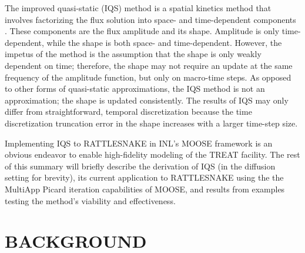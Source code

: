 \documentclass[12pt]{article}
\begin{document}
The improved quasi-static (IQS) method is a spatial kinetics method that involves factorizing the flux solution into space- and time-dependent components \cite{Ott_1966,Dulla2008}.  These components are the flux amplitude and its shape. Amplitude is only time-dependent, while the shape is both space- and time-dependent.  However, the impetus of the method is the assumption that the shape is only weakly dependent on time; therefore, the shape may not require an update at the same frequency of the amplitude function, but only on macro-time steps. As opposed to other forms of quasi-static approximations, the IQS method is not an approximation; the shape is updated consistently.  The results of IQS may only differ from straightforward, temporal discretization because the time discretization truncation error in the shape increases with a larger time-step size. 

Implementing IQS to RATTLESNAKE in INL's MOOSE framework is an obvious endeavor to enable high-fidelity modeling of the TREAT facility. The rest of this summary will briefly describe the derivation of IQS (in the diffusion setting for brevity), its current application to RATTLESNAKE using the the MultiApp Picard iteration capabilities of MOOSE, and results from examples testing the method's viability and effectiveness.

%
\section{BACKGROUND}
\label{sect::background}
\end{document}
